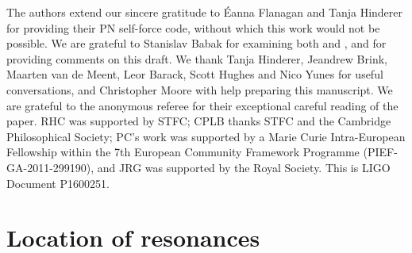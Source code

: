 \documentclass[aps,prd,amsfonts,amssymb,amsmath,nofootinbib,showpacs,superscriptaddress,twocolumn,floatfix]{revtex4-1}
\begin{document}
\begin{acknowledgments}
The authors extend our sincere gratitude to \'{E}anna Flanagan and Tanja Hinderer for providing their PN self-force code, without which this work would not be possible. We are grateful to Stanislav Babak for examining both \cite{BerryThesis2013} and \cite{ColeThesis2015}, and for providing comments on this draft. We thank Tanja Hinderer, Jeandrew Brink, Maarten van de Meent, Leor Barack, Scott Hughes and Nico Yunes for useful conversations, and Christopher Moore with help preparing this manuscript. We are grateful to the anonymous referee for their exceptional careful reading of the paper. RHC was supported by STFC; CPLB thanks STFC and the Cambridge Philosophical Society; PC's work was supported by a Marie Curie Intra-European Fellowship within the 7th European Community Framework Programme (PIEF-GA-2011-299190), and JRG was supported by the Royal Society. This is LIGO Document P1600251. 
\end{acknowledgments}

\appendix

\section{Location of resonances}\label{sec:location}
\end{document}
